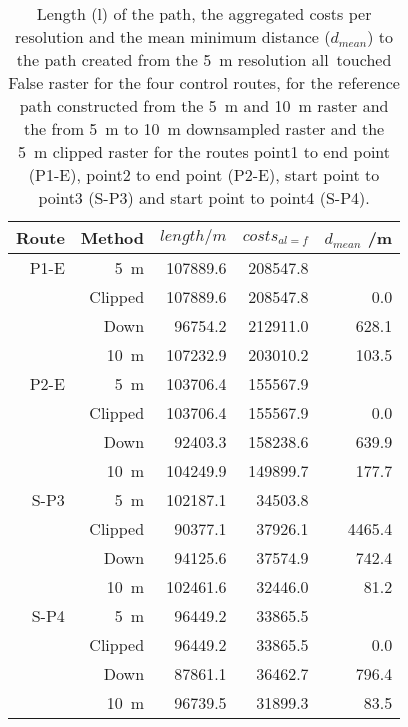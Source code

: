 \begin{table}[h!]
	\caption{Length (l) of the path, the aggregated costs per resolution and the mean minimum distance ($d_{mean}$) to the path created from the 5~m resolution all~touched False raster for the four control routes, for the reference path constructed from the 5~m  and 10~m raster and the from 5~m to 10~m downsampled raster and the 5~m clipped raster for the routes point1 to end point (P1-E), point2 to end point (P2-E), start point to point3 (S-P3) and start point to point4 (S-P4).}
	\label{tab:6}
	\centering
	\begin{tabular}{ r @{\hspace*{3mm}}  r  r  r  r}
		Route & Method & $length /m$ & $costs_{al=f}$ & $d_{mean}$ /m \\
		\hline
		P1-E & 5~m 			& 107889.6 & 208547.8 &        \\
		 	 & Clipped 		& 107889.6 & 208547.8 &   0.0  \\
		 	 & Down			&  96754.2 & 212911.0 & 628.1 \\
		 	 & 10~m 		& 107232.9 & 203010.2 & 103.5 \\
		\hline
		P2-E & 5~m 			& 103706.4 & 155567.9 &        \\
		 	 & Clipped 		& 103706.4 & 155567.9 &   0.0 \\
		 	 & Down 	    &  92403.3 & 158238.6	& 639.9 \\
		 	 & 10~m 		& 104249.9 & 149899.7 & 177.7 \\
		\hline
		S-P3 & 5~m 			& 102187.1 & 34503.8 	&         \\
			 & Clipped 		&  90377.1 & 37926.1 	& 4465.4 \\
			 & Down 	    &  94125.6 & 37574.9 	&  742.4 \\
			 & 10~m 		& 102461.6 & 32446.0 	&   81.2 \\
		\hline
		S-P4 & 5~m 			& 96449.2 	& 33865.5 	&  		\\
		 	 & Clipped 		& 96449.2 	& 33865.5 	& 0.0 	\\
			 & Down 		& 87861.1 	& 36462.7 	& 796.4\\
			 & 10~m 		& 96739.5 	& 31899.3	& 83.5 \\

		
	\end{tabular}
\end{table}



